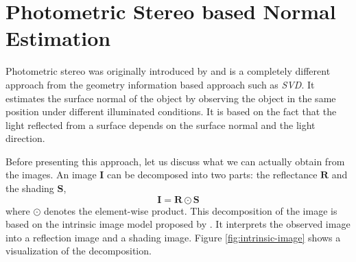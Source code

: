 \section{Photometric Stereo based Normal Estimation}
Photometric stereo was originally introduced by \cite{photometric-stereo} and is a completely different approach from the geometry information based approach such as \textit{SVD}. It estimates the surface normal of the object by observing the object in the same position under different illuminated conditions. It is based on the fact that the light reflected from a surface depends on the surface normal and the light direction.

Before presenting this approach, let us discuss what we can actually obtain from the images.
An image $ \textbf{I} $ can be decomposed into two parts: the reflectance $ \textbf{R} $ and the shading $ \textbf{S} $,
\[ \textbf{I} = \textbf{R}\odot \textbf{S}\]
where $ \odot $ denotes the element-wise product. This decomposition of the image is based on the intrinsic image model proposed by \cite{intrinsic-image}. It interprets the observed image into a reflection image and a shading image. Figure \ref{fig:intrinsic-image} shows a visualization of the decomposition.

